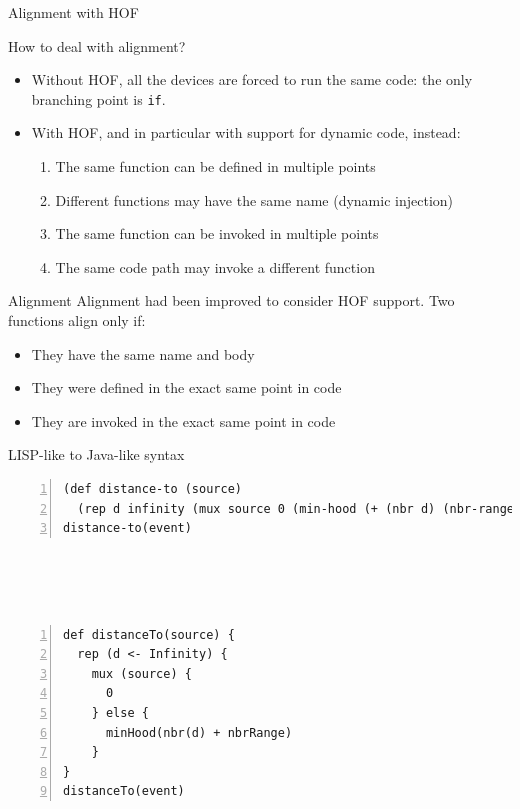 \documentclass[presentation]{beamer}\mode<presentation>{\usetheme{sapere}}
\begin{document}
\begin{frame}{Alignment with HOF}
  \begin{block} {How to deal with alignment?}
   \begin{itemize}
    \item     Without HOF, all the devices are forced to run the same code: the only branching point is \texttt{if}.
    \item With HOF, and in particular with support for dynamic code, instead:
    \scriptsize
    \begin{enumerate}
      \item The same function can be defined in multiple points
      \item Different functions may have the same name (dynamic injection)
      \item The same function can be invoked in multiple points
      \item The same code path may invoke a different function
    \end{enumerate}
   \end{itemize}
  \end{block}
  \begin{block} {Alignment}
    Alignment had been improved to consider HOF support.
   Two functions align only if:
    \begin{itemize}
      \item They have the same name and body
      \item They were defined in the exact same point in code
      \item They are invoked in the exact same point in code
    \end{itemize}
  \end{block}
\end{frame}

\begin{frame}[fragile]{LISP-like to Java-like syntax}
    \scriptsize
    \begin{lstlisting}[mathescape,morekeywords={rep,mux,sense,inf,def,min,hood,nbr,nbr,range,else,if,Infinity},numbers=left,basicstyle=\ttfamily]
(def distance-to (source)
  (rep d infinity (mux source 0 (min-hood (+ (nbr d) (nbr-range))))))
distance-to(event)
    \end{lstlisting}
    ~ \\ ~ \\ ~ \\
    \scriptsize
    \begin{lstlisting}[mathescape,morekeywords={rep,mux,sense,inf,def,minHood,nbr,nbr,nbrRange,else,if,Infinity},numbers=left,basicstyle=\ttfamily]
def distanceTo(source) {
  rep (d <- Infinity) {
    mux (source) {
      0
    } else {
      minHood(nbr(d) + nbrRange)
    }
}
distanceTo(event)
    \end{lstlisting}
\end{frame}
\end{document}
